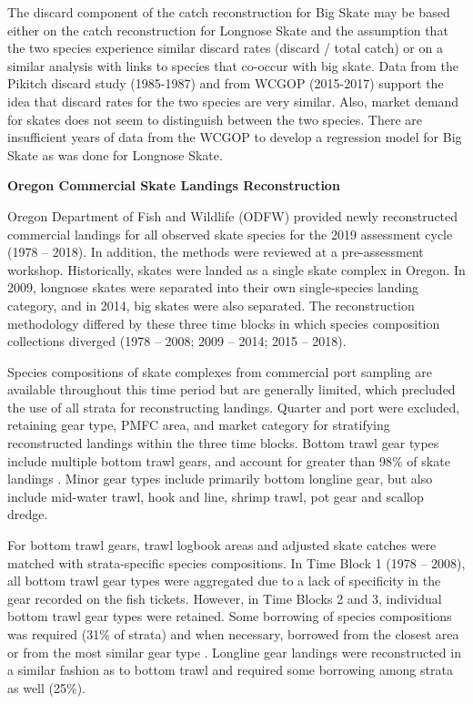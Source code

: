 \documentclass[12pt,]{article}
\begin{document}
The discard component of the catch reconstruction for Big Skate may be
based either on the catch reconstruction for Longnose Skate and the
assumption that the two species experience similar discard rates
(discard / total catch) or on a similar analysis with links to species
that co-occur with big skate. Data from the Pikitch discard study
(1985-1987) and from WCGOP (2015-2017) support the idea that discard
rates for the two species are very similar. Also, market demand for
skates does not seem to distinguish between the two species. There are
insufficient years of data from the WCGOP to develop a regression model
for Big Skate as was done for Longnose Skate.

\textbf{Oregon Commercial Skate Landings Reconstruction}

Oregon Department of Fish and Wildlife (ODFW) provided newly
reconstructed commercial landings for all observed skate species for the
2019 assessment cycle (1978 -- 2018). In addition, the methods were
reviewed at a pre-assessment workshop. Historically, skates were landed
as a single skate complex in Oregon. In 2009, longnose skates were
separated into their own single-species landing category, and in 2014,
big skates were also separated. The reconstruction methodology differed
by these three time blocks in which species composition collections
diverged (1978 -- 2008; 2009 -- 2014; 2015 -- 2018).

Species compositions of skate complexes from commercial port sampling
are available throughout this time period but are generally limited,
which precluded the use of all strata for reconstructing landings.
Quarter and port were excluded, retaining gear type, PMFC area, and
market category for stratifying reconstructed landings within the three
time blocks. Bottom trawl gear types include multiple bottom trawl
gears, and account for greater than 98\% of skate landings . Minor gear
types include primarily bottom longline gear, but also include mid-water
trawl, hook and line, shrimp trawl, pot gear and scallop dredge.

For bottom trawl gears, trawl logbook areas and adjusted skate catches
were matched with strata-specific species compositions. In Time Block 1
(1978 -- 2008), all bottom trawl gear types were aggregated due to a
lack of specificity in the gear recorded on the fish tickets. However,
in Time Blocks 2 and 3, individual bottom trawl gear types were
retained. Some borrowing of species compositions was required (31\% of
strata) and when necessary, borrowed from the closest area or from the
most similar gear type . Longline gear landings were reconstructed in a
similar fashion as to bottom trawl and required some borrowing among
strata as well (25\%).
\end{document}
